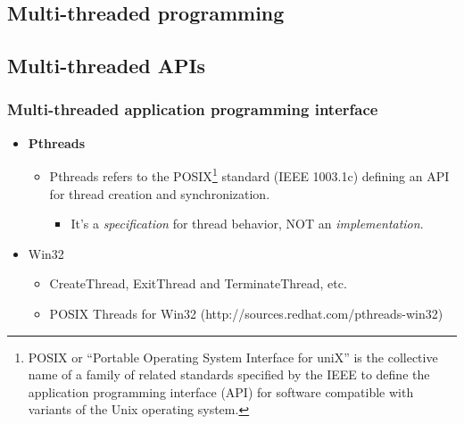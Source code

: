 \documentclass[CJKutf8,xcolor=pdftex,dvipsnames,table]{beamer}
\begin{document}
\begin{CJK*}{UTF8}{song}
  \section{Multi-threaded programming}

  \subsection{Multi-threaded APIs}

  \begin{frame}
  \frametitle{Multi-threaded application programming interface} \pause
  \begin{itemize}
  \item{\textbf{Pthreads}} \pause
    \begin{itemize}
    \item{Pthreads refers to the POSIX\footnote{POSIX or ``Portable Operating System Interface for uniX'' is the collective name of a family of related standards specified by the IEEE to define the application programming interface (API) for software compatible with variants of the Unix operating system.} standard (IEEE 1003.1c) defining an API for thread creation and synchronization.} \pause
      \begin{itemize}
      \item{It's a \emph{specification} for thread behavior, NOT an \emph{implementation}.} \pause
      \end{itemize}
    \end{itemize}
  \item{Win32} \pause
    \begin{itemize}
    \item{CreateThread, ExitThread and TerminateThread, etc.} \pause
    \item{POSIX Threads for Win32 (http://sources.redhat.com/pthreads-win32)}
    \end{itemize}
  \end{itemize}
  \end{frame}


\end{CJK*}
\end{document}
